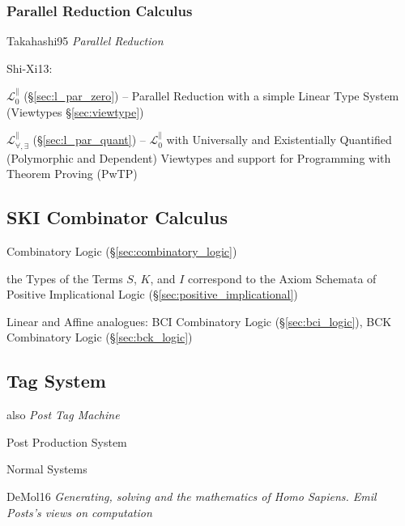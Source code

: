 \endgroup



\subsubsection{Parallel Reduction Calculus}
\label{sec:parallel_reduction_calculus}


Takahashi95 \emph{Parallel Reduction}

Shi-Xi13:

\fist $\mathcal{L}^\parallel_0$ (\S\ref{sec:l_par_zero}) --
Parallel Reduction with a simple Linear Type System (Viewtypes
\S\ref{sec:viewtype})

\fist $\mathcal{L}^\parallel_{\forall,\exists}$
(\S\ref{sec:l_par_quant}) -- $\mathcal{L}^\parallel_0$ with
Universally and Existentially Quantified (Polymorphic and Dependent)
Viewtypes and support for Programming with Theorem Proving (PwTP)



\subsection{SKI Combinator Calculus}\label{sec:ski_calculus}

Combinatory Logic (\S\ref{sec:combinatory_logic})

the Types of the Terms $S$, $K$, and $I$ correspond to the Axiom
Schemata of Positive Implicational Logic
(\S\ref{sec:positive_implicational})

Linear and Affine analogues: BCI Combinatory Logic
(\S\ref{sec:bci_logic}), BCK Combinatory Logic (\S\ref{sec:bck_logic})



\subsection{Tag System}\label{sec:tag_system}

also \emph{Post Tag Machine}

Post Production System %

Normal Systems

DeMol16 \emph{Generating, solving and the mathematics of Homo Sapiens.
  Emil Posts's views on computation}



